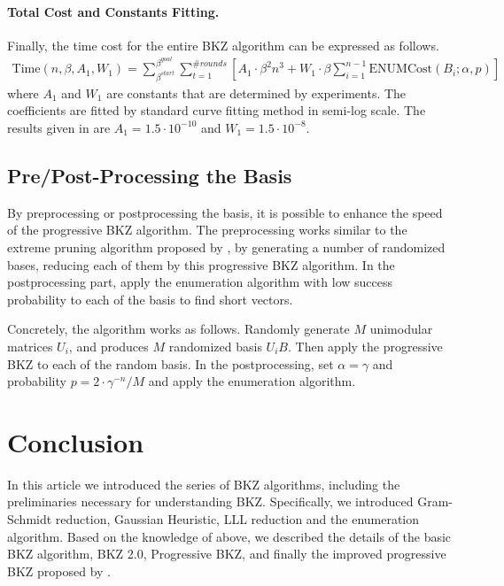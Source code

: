 \documentclass[11pt]{article}
\newcommand{\ENUMCost}{\mathrm{ENUMCost}}
\begin{document}
\paragraph{Total Cost and Constants Fitting.}
Finally, the time cost for the entire BKZ algorithm can be expressed as follows.
\begin{eqnarray}
\mathrm{Time}(n,\beta,A_1,W_1)=\sum_{\beta^{start}}^{\beta^{goal}}\sum_{t=1}^{\#rounds}
\left[A_1\cdot\beta^2 n^3+W_1\cdot\beta\sum_{i=1}^{n-1}\ENUMCost(B_i;\alpha,p)\right]
\end{eqnarray}
where $A_1$ and $W_1$ are constants that are determined by experiments.
The coefficients are fitted by standard curve fitting method in semi-log scale.
The results given in \cite{awht2016improved} are $A_1=1.5\cdot 10^{-10}$ and $W_1=1.5\cdot 10^{-8}$.


\subsection{Pre/Post-Processing the Basis}

By preprocessing or postprocessing the basis, it is possible to enhance the speed of the progressive BKZ algorithm.
The preprocessing works similar to the extreme pruning algorithm proposed by \cite{gnr2010lattice}, by generating a number of randomized bases, reducing each of them by this progressive BKZ algorithm.
In the postprocessing part, apply the enumeration algorithm with low success probability to each of the basis to find short vectors.

Concretely, the algorithm works as follows.
Randomly generate $M$ unimodular matrices $U_i$, and produces $M$ randomized basis $U_iB$.
Then apply the progressive BKZ to each of the random basis.
In the postprocessing, set $\alpha=\gamma$ and probability $p=2\cdot\gamma^{-n}/M$ and apply the enumeration algorithm.


\section{Conclusion}
\label{sec:con}

In this article we introduced the series of BKZ algorithms, including the preliminaries necessary for understanding BKZ.
Specifically, we introduced Gram-Schmidt reduction, Gaussian Heuristic, LLL reduction and the enumeration algorithm.
Based on the knowledge of above, we described the details of the basic BKZ algorithm, BKZ 2.0, Progressive BKZ, and finally the improved progressive BKZ proposed by \cite{awht2016improved}.
\end{document}
